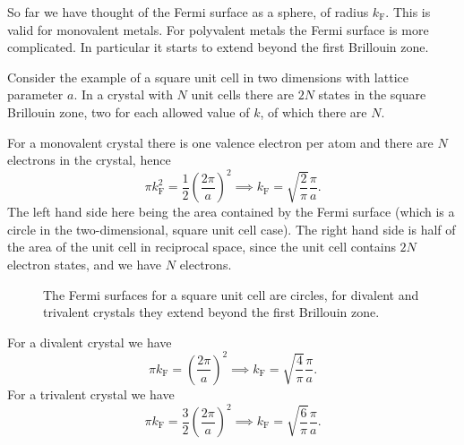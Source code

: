 \documentclass[fleqn]{NotesClass}
\newcommand*{\fermi}{\mathrm{F}}
\begin{document}
    So far we have thought of the Fermi surface as a sphere, of radius \(k_{\fermi}\).
    This is valid for monovalent metals.
    For polyvalent metals the Fermi surface is more complicated.
    In particular it starts to extend beyond the first Brillouin zone.
    
    Consider the example of a square unit cell in two dimensions with lattice parameter \(a\).
    In a crystal with \(N\) unit cells there are \(2N\) states in the square Brillouin zone, two for each allowed value of \(k\), of which there are \(N\).
    
    For a monovalent crystal there is one valence electron per atom and there are \(N\) electrons in the crystal, hence
    \begin{equation}
        \pi k_{\fermi}^2 = \frac{1}{2}\left( \frac{2\pi}{a} \right)^2 \implies k_{\fermi} = \sqrt{\frac{2}{\pi}} \frac{\pi}{a}.
    \end{equation}
    The left hand side here being the area contained by the Fermi surface (which is a circle in the two-dimensional, square unit cell case).
    The right hand side is half of the area of the unit cell in reciprocal space, since the unit cell contains \(2N\) electron states, and we have \(N\) electrons.
    
    \begin{figure}
        \caption[Square unit cell Fermi surfaces]{The Fermi surfaces for a square unit cell are circles, for divalent and trivalent crystals they extend beyond the first Brillouin zone.}
    \end{figure}
    
    For a divalent crystal we have
    \begin{equation}
        \pi k_{\fermi} = \left( \frac{2\pi}{a} \right)^2 \implies k_{\fermi} = \sqrt{\frac{4}{\pi}}\frac{\pi}{a}.
    \end{equation}
    For a trivalent crystal we have
    \begin{equation}
        \pi k_{\fermi} = \frac{3}{2} \left( \frac{2\pi}{a} \right)^2 \implies k_{\fermi} = \sqrt{\frac{6}{\pi}}\frac{\pi}{a}.
    \end{equation}
    
\end{document}
